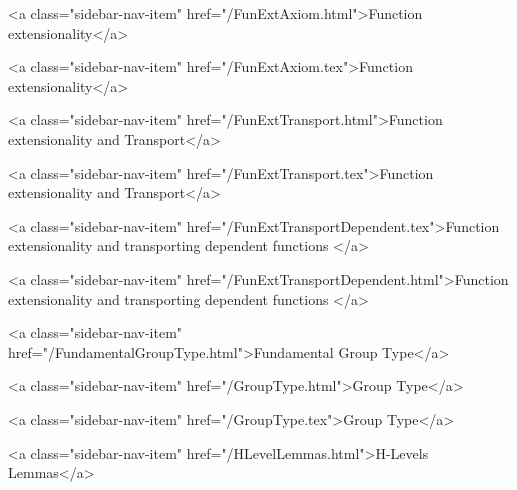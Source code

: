       
    
      
        
          <a class="sidebar-nav-item" href="/FunExtAxiom.html">Function extensionality</a>
        
      
    
      
        
          <a class="sidebar-nav-item" href="/FunExtAxiom.tex">Function extensionality</a>
        
      
    
      
        
          <a class="sidebar-nav-item" href="/FunExtTransport.html">Function extensionality and Transport</a>
        
      
    
      
        
          <a class="sidebar-nav-item" href="/FunExtTransport.tex">Function extensionality and Transport</a>
        
      
    
      
        
          <a class="sidebar-nav-item" href="/FunExtTransportDependent.tex">Function extensionality and transporting dependent functions </a>
        
      
    
      
        
          <a class="sidebar-nav-item" href="/FunExtTransportDependent.html">Function extensionality and transporting dependent functions </a>
        
      
    
      
        
          <a class="sidebar-nav-item" href="/FundamentalGroupType.html">Fundamental Group Type</a>
        
      
    
      
        
          <a class="sidebar-nav-item" href="/GroupType.html">Group Type</a>
        
      
    
      
        
          <a class="sidebar-nav-item" href="/GroupType.tex">Group Type</a>
        
      
    
      
        
          <a class="sidebar-nav-item" href="/HLevelLemmas.html">H-Levels Lemmas</a>
        
      
    
